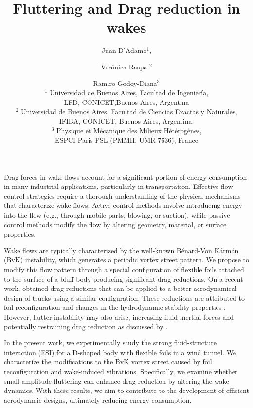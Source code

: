 \documentclass[a4paper,11pt]{article}
\begin{document}
\vspace{-1.0cm}

\title{Fluttering and Drag reduction in wakes}

\author{Juan D'Adamo$^1$, \and Verónica Raspa $^2$ \and Ramiro Godoy-Diana$^{3}$\\
  $^1$  Universidad de Buenos Aires, Facultad de Ingenier\'ia, \\LFD, CONICET,Buenos Aires, Argentina\\
  $^2$ Universidad de Buenos Aires, Facultad de Ciencias Exactas y Naturales,\\  IFIBA, CONICET,   Buenos Aires,  Argentina.\\
  $^3$ Physique et Mécanique des Milieux Hétérogènes, \\ESPCI Paris-PSL (PMMH, UMR 7636), France  
}
\date{}
\maketitle

Drag forces in wake flows account for a significant portion of energy consumption in many industrial applications, particularly in transportation. Effective flow control strategies require a thorough understanding of the physical mechanisms that characterize wake flows. Active control methods involve introducing energy into the flow (e.g., through mobile parts, blowing, or suction), while passive control methods modify the flow by altering geometry, material, or surface properties.


Wake flows are typically characterized by the well-known Bénard-Von Kármán (BvK) instability, which generates a periodic vortex street pattern. We propose to modify this flow pattern through a special configuration of flexible foils attached to the surface of a bluff body producing significant drag reductions. 	On a recent work, \cite{garcia2021drag} obtained drag reductions that can be applied to a better aerodynamical design of trucks using a similar configuration. 	
 These reductions are attributed to foil reconfiguration \cite{gosselin2010drag} and changes in the hydrodynamic stability properties \citep{strykowski1990formation,Giannetti:2007p127,thiria2009passive}. However, flutter instability may also arise, increasing fluid inertial forces and potentially restraining drag reduction as discussed by \cite{leclercq2018does}.
		 
	
	In the present work, we experimentally study the strong fluid-structure interaction (FSI) for a D-shaped body with flexible foils in a wind tunnel. We characterize the modifications to the BvK vortex street caused by foil reconfiguration and wake-induced vibrations. Specifically, we examine whether small-amplitude fluttering can enhance drag reduction by altering the wake dynamics. With these results, we aim to contribute to the development of efficient aerodynamic designs, ultimately reducing energy consumption.
	
\end{document}
